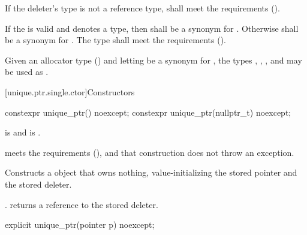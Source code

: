 \pnum
If the deleter's type  is not a reference type,  shall meet
the  requirements ().

\pnum
If the   is valid and denotes a
type, then  shall be a synonym for . Otherwise
 shall be a synonym for . The type  shall
meet the  requirements ().

\pnum
\begin{example}
Given an allocator type  () and
letting  be a synonym for , the types ,
, , and 
may be used as .
\end{example}

[unique.ptr.single.ctor]{Constructors}

%
\begin{itemdecl}
constexpr unique_ptr() noexcept;
constexpr unique_ptr(nullptr_t) noexcept;
\end{itemdecl}

\begin{itemdescr}
\pnum
\constraints
{} is  and
 is .

\pnum
\expects
{} meets the  requirements (),
and that construction does not throw an exception.

\pnum
\effects
Constructs a  object that owns
nothing, value-initializing the stored pointer and the stored deleter.

\pnum
\ensures
{}. 
returns a reference to the stored deleter.
\end{itemdescr}

%
\begin{itemdecl}
explicit unique_ptr(pointer p) noexcept;
\end{itemdecl}


